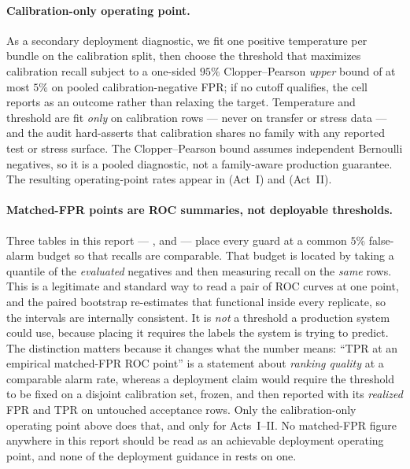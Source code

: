 \paragraph{Calibration-only operating point.} As a secondary deployment diagnostic, we fit one positive
temperature per bundle on the calibration split, then choose the threshold that maximizes calibration
recall subject to a one-sided $95\%$ Clopper--Pearson \emph{upper} bound of at most $5\%$ on pooled
calibration-negative FPR; if no cutoff qualifies, the cell reports  as an
outcome rather than relaxing the target. Temperature and threshold are fit \emph{only} on calibration
rows --- never on transfer or stress data --- and the audit hard-asserts that calibration shares no
family with any reported test or stress surface. The Clopper--Pearson bound assumes independent
Bernoulli negatives, so it is a pooled diagnostic, not a family-aware production guarantee. The
resulting operating-point rates appear in  (Act~I) and 
(Act~II).

\paragraph{Matched-FPR points are ROC summaries, not deployable thresholds.}
\label{sec:matched-fpr-limits}
Three tables in this report --- ,  and  --- place
every guard at a common $5\%$ false-alarm budget so that recalls are comparable. That budget is located
by taking a quantile of the \emph{evaluated} negatives and then measuring recall on the \emph{same}
rows. This is a legitimate and standard way to read a pair of ROC curves at one point, and the paired
bootstrap re-estimates that functional inside every replicate, so the intervals are internally
consistent. It is \emph{not} a threshold a production system could use, because placing it requires the
labels the system is trying to predict. The distinction matters because it changes what the number
means: ``TPR at an empirical matched-FPR ROC point'' is a statement about \emph{ranking quality} at a
comparable alarm rate, whereas a deployment claim would require the threshold to be fixed on a disjoint
calibration set, frozen, and then reported with its \emph{realized} FPR and TPR on untouched acceptance
rows. Only the calibration-only operating point above does that, and only for Acts~I--II. No
matched-FPR figure anywhere in this report should be read as an achievable deployment operating point,
and none of the deployment guidance in  rests on one.

